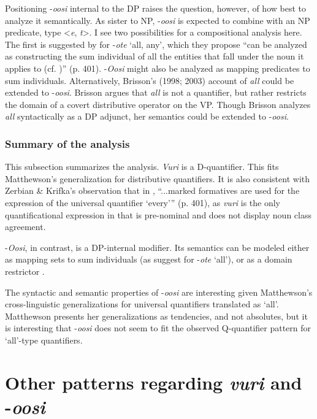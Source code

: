 \documentclass[output=paper]{langsci/langscibook}
\begin{document}
Positioning -\textit{oosi} internal to the DP raises the question, however, of how best to analyze it semantically. As sister to NP, -\textit{oosi} is expected to combine with an NP predicate, type <\textit{e},\textit{ t}>. I see two possibilities for a compositional analysis here. The first is suggested by \citet{ZerbianKrifka2008} for  -\textit{ote} ‘all, any’, which they propose “can be analyzed as constructing the sum individual of all the entities that fall under the noun it applies to (cf. \citealt{Link1983})” (p. 401). -\textit{Oosi} might also be analyzed as mapping predicates to sum individuals. Alternatively, Brisson’s (1998; 2003) account of  \textit{all} could be extended to  -\textit{oosi}. Brisson argues that  \textit{all} is not a quantifier, but rather restricts the domain of a covert distributive operator on the VP. Though Brisson analyzes  \textit{all} syntactically as a DP adjunct, her semantics could be extended to  -\textit{oosi}. 

\subsubsection{Summary of the analysis}

This subsection summarizes the analysis. \textit{Vuri} is a D-quantifier. This fits Matthewson's generalization for distributive quantifiers. It is also consistent with Zerbian \& Krifka's observation that in , “...marked formatives are used for the expression of the universal quantifier `every'” (p. 401), as \textit{vuri} is the only quantificational expression in  that is pre-nominal and does not display noun class agreement. 

-\textit{Oosi}, in contrast, is a DP-internal modifier. Its semantics can be modeled either as mapping sets to sum individuals (as \citealt{ZerbianKrifka2008} suggest for  -\textit{ote} ‘all’), or as a domain restrictor \citep{Brisson1998,Brisson2003}. 

The syntactic and semantic properties of -\textit{oosi} are interesting given Matthewson's cross-linguistic generalizations for universal quantifiers translated as ‘all’. Matthewson presents her generalizations as tendencies, and not absolutes, but it is interesting that -\textit{oosi} does not seem to fit the observed Q-quantifier pattern for ‘all’-type quantifiers. 

\section{Other patterns regarding \textit{vuri} and -\textit{oosi}}\label{sec:landman:4}
\end{document}
